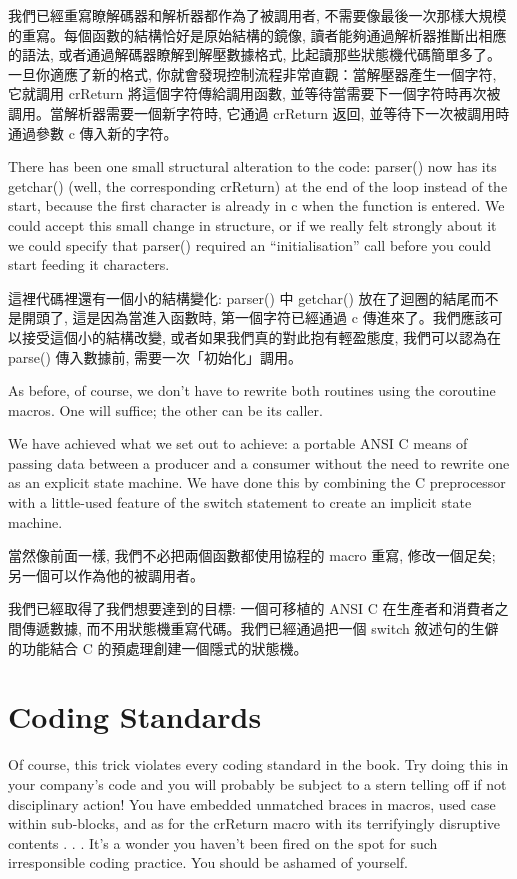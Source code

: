 \documentclass[12pt]{article}
\begin{document}
\begin{CJK}{UTF8}{bsmi}
我們已經重寫瞭解碼器和解析器都作為了被調用者, 不需要像最後一次那樣大規模的重寫。每個函數的結構恰好是原始結構的鏡像, 讀者能夠通過解析器推斷出相應的語法, 或者通過解碼器瞭解到解壓數據格式, 比起讀那些狀態機代碼簡單多了。一旦你適應了新的格式, 你就會發現控制流程非常直觀：當解壓器產生一個字符, 它就調用 crReturn 將這個字符傳給調用函數, 並等待當需要下一個字符時再次被調用。當解析器需要一個新字符時, 它通過
crReturn 返回, 並等待下一次被調用時通過參數 c 傳入新的字符。

There has been one small structural alteration to the code: parser() now has its getchar() (well, the corresponding crReturn) at the end of the loop instead of the start, because the first character is already in c when the function is entered. We could accept this small change in structure, or if we really felt strongly about it we could specify that parser() required an ``initialisation'' call before you could start feeding it characters.

這裡代碼裡還有一個小的結構變化: parser() 中 getchar() 放在了迴圈的結尾而不是開頭了, 這是因為當進入函數時, 第一個字符已經通過 c
傳進來了。我們應該可以接受這個小的結構改變, 或者如果我們真的對此抱有輕盈態度, 我們可以認為在 parse()
傳入數據前, 需要一次「初始化」調用。 

As before, of course, we don't have to rewrite both routines using the coroutine macros. One will suffice; the other can be its caller.

We have achieved what we set out to achieve: a portable ANSI C means of passing data between a producer and a consumer without the need to rewrite one as an explicit state machine. We have done this by combining the C preprocessor with a little-used feature of the switch statement to create an implicit state machine.

當然像前面一樣, 我們不必把兩個函數都使用協程的 macro 重寫, 修改一個足矣; 另一個可以作為他的被調用者。

我們已經取得了我們想要達到的目標: 一個可移植的 ANSI C 在生產者和消費者之間傳遞數據, 而不用狀態機重寫代碼。我們已經通過把一個
switch 敘述句的生僻的功能結合 C 的預處理創建一個隱式的狀態機。 

\section{Coding Standards}

Of course, this trick violates every coding standard in the book. Try doing this in your company's code and you will probably be subject to a stern telling off if not disciplinary action! You have embedded unmatched braces in macros, used case within sub-blocks, and as for the crReturn macro with its terrifyingly disruptive contents . . . It's a wonder you haven't been fired on the spot for such irresponsible coding practice. You should be ashamed of yourself.


\end{CJK}
\end{document}
